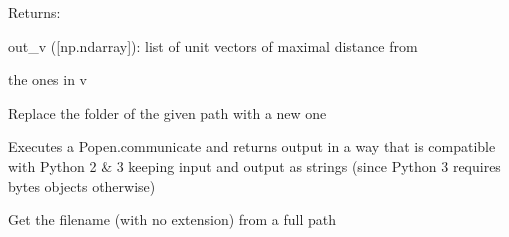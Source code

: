 \documentclass[letterpaper,10pt,english]{sphinxmanual}
\begin{document}
\begin{fulllineitems}
\begin{DUlineblock}{0em}
\item[] Returns:
\item[]
\begin{DUlineblock}{\DUlineblockindent}
\item[] out\_v ({[}np.ndarray{]}): list of unit vectors of maximal distance from
\item[]
\begin{DUlineblock}{\DUlineblockindent}
\item[] the ones in v
\end{DUlineblock}
\end{DUlineblock}
\end{DUlineblock}

\end{fulllineitems}


\begin{fulllineitems}
\label{doctree/soprano.utils:soprano.utils.replace_folder}
Replace the folder of the given path with a new one

\end{fulllineitems}


\begin{fulllineitems}
\label{doctree/soprano.utils:soprano.utils.safe_communicate}
Executes a Popen.communicate and returns output in a way that is
compatible with Python 2 \& 3 keeping input and output as strings (since
Python 3 requires bytes objects otherwise)

\end{fulllineitems}


\begin{fulllineitems}
\label{doctree/soprano.utils:soprano.utils.seedname}
Get the filename (with no extension) from a full path

\end{fulllineitems}

\end{document}
